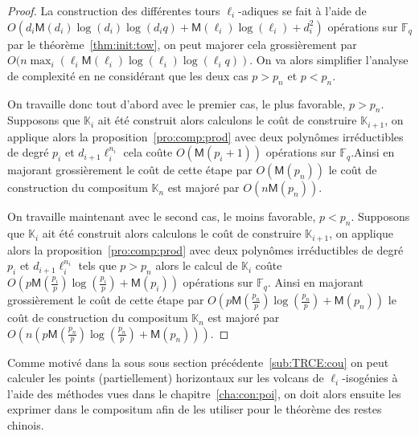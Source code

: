 \documentclass[10pt,a4paper]{book}
\theoremstyle{plain}
\theoremstyle{definition}
\theoremstyle{definition}
\theoremstyle{definition}
\theoremstyle{definition}
\theoremstyle{remark}
\theoremstyle{remark}
\theoremstyle{definition}
\begin{document}
\begin{proof}
La construction des différentes tours $\ell_i$-adiques se fait à l'aide de 
$O(d_i\mathsf{M}(d_i)\log(d_i)\log(d_iq)+\mathsf{M}(\ell_i)\log(\ell_i)+d_i^2)$ 
opérations sur $\mathbb{F}_q$ par le théorème~\ref{thm:init:tow}, on peut 
majorer cela grossièrement par 
$O(n \max_i(\ell_i\mathsf{M}(\ell_i)\log(\ell_i)\log(\ell_iq))$.
On va alors simplifier l'analyse de complexité en ne considérant que les deux 
cas $p>p_n$ et $p<p_n$.

On travaille donc tout d'abord avec le premier cas, le plus favorable, $p>p_n$.
Supposons que $\mathbb{K}_i$ ait été construit alors calculons le coût de 
construire $\mathbb{K}_{i+1}$, on applique alors la 
proposition~\ref{pro:comp:prod} avec deux polynômes irréductibles de degré 
$p_i$ et $d_{i+1}\ell_i^{n_i}$ cela coûte $O(\mathsf{M}(p_i+1))$ opérations sur
$\mathbb{F}_q$.Ainsi en majorant grossièrement le coût de cette étape par 
$O(\mathsf{M}(p_n))$ le coût de construction du compositum $\mathbb{K}_n$ 
est majoré par $O(n\mathsf{M}(p_n))$.

On travaille maintenant avec le second cas, le moins favorable, $p<p_n$.
Supposons que $\mathbb{K}_i$ ait été construit alors calculons le coût de 
construire $\mathbb{K}_{i+1}$, on applique alors la 
proposition~\ref{pro:comp:prod} avec deux polynômes irréductibles de degré 
$p_i$ et $d_{i+1}\ell_i^{n_i}$ tels que $p>p_n$ alors le calcul de 
$\mathbb{K}_i$ coûte 
$O(p\mathsf{M}(\frac{p_i}{p})\log(\frac{p_i}{p})+\mathsf{M}(p_i))$
opérations sur $\mathbb{F}_q$. Ainsi en majorant grossièrement le coût de cette
étape par $O(p\mathsf{M}(\frac{p_n}{p})\log(\frac{p_n}{p})+\mathsf{M}(p_n))$
le coût de construction du compositum $\mathbb{K}_n$ est majoré par 
$O(n(p\mathsf{M}(\frac{p_n}{p})\log(\frac{p_n}{p})+\mathsf{M}(p_n)))$.
\end{proof}



 Comme motivé dans la sous sous section précédente~\ref{sub:TRCE:cou} on peut 
 calculer les points (partiellement) horizontaux sur les volcans de 
 $\ell_i$-isogénies à l'aide des méthodes vues dans le 
 chapitre~\ref{cha:con:poi}, on doit alors ensuite les exprimer dans le
 compositum afin de les utiliser pour le théorème des restes chinois.
  
\end{document}
